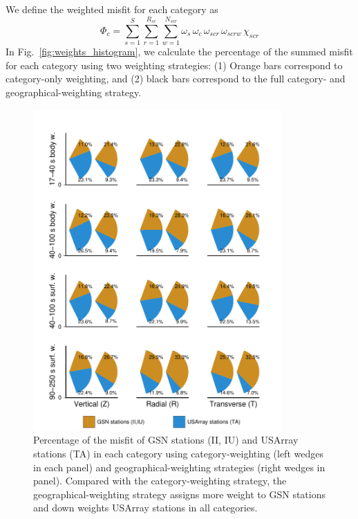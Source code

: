 We define the weighted misfit for each category as
\begin{equation}
\Phi_{c} = \sum_{s=1}^{S} \sum_{r=1}^{R_{sc}} \sum_{w=1}^{N_{scr}} \omega_s\, \omega_{c} \,\omega_{scr}\, \omega_{scrw}\, \chi_{scr}
\end{equation}
In Fig.~\ref{fig:weights_histogram}, we calculate the percentage of the summed misfit for each category 
using two weighting strategies: (1) Orange bars correspond to category-only weighting, and (2) black bars correspond to the full category- and geographical-weighting strategy.

\begin{figure}
\centering
\includegraphics[width=0.85\textwidth]{ch-weighting/figures/category_sta_misfit_contribution.pdf}
\caption{\small{Percentage of the misfit of GSN stations (II, IU) and USArray stations (TA)
in each category using category-weighting (left wedges in each panel) and geographical-weighting
strategies (right wedges in panel).
Compared with the category-weighting strategy, the geographical-weighting 
strategy assigns more weight to GSN stations and down weights USArray stations in all categories.
}}
\label{fig:weights_contribution_sta}
\end{figure}

